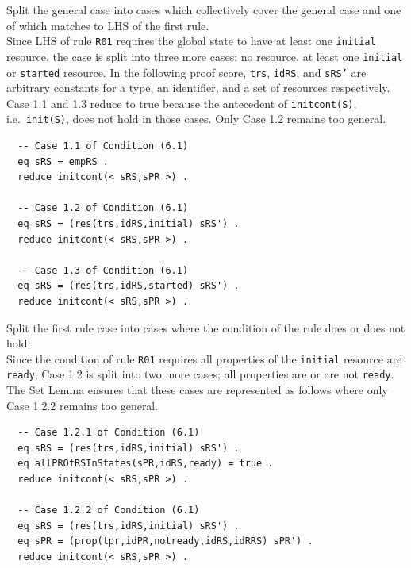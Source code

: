 \documentclass[12pt]{report}
\newcommand{\stt}[1]{{\small{\tt {#1}}}}
\begin{document}
 Split the general case into cases which
collectively cover the general case and one of which matches to LHS of
the first rule. \\ Since LHS of rule {\tt R01} requires the global
state to have at least one {\tt initial} resource, the case is split
into three more cases; no resource, at least one {\tt initial} or
{\tt started} resource. In the following proof score, {\tt trs},
{\tt idRS}, and {\tt sRS'} are arbitrary constants for a type, an
identifier, and a set of resources respectively.  Case 1.1 and 1.3
reduce to true because the antecedent of \stt{initcont(S)},
i.e.\ \stt{init(S)}, does not hold in those cases. Only Case 1.2
remains too general.
\begin{verbatim}
  -- Case 1.1 of Condition (6.1)
  eq sRS = empRS .
  reduce initcont(< sRS,sPR >) .

  -- Case 1.2 of Condition (6.1)
  eq sRS = (res(trs,idRS,initial) sRS') .
  reduce initcont(< sRS,sPR >) .

  -- Case 1.3 of Condition (6.1)
  eq sRS = (res(trs,idRS,started) sRS') .
  reduce initcont(< sRS,sPR >) .
\end{verbatim}

 Split the first rule case into cases where
the condition of the rule does or does not hold. \\ Since the
condition of rule {\tt R01} requires all properties of the
{\tt initial} resource are {\tt ready}, Case 1.2 is split into two
more cases; all properties are or are not {\tt ready}. The Set Lemma
ensures that these cases are represented as follows where only Case
1.2.2 remains too general.
\begin{verbatim}
  -- Case 1.2.1 of Condition (6.1)
  eq sRS = (res(trs,idRS,initial) sRS') .
  eq allPROfRSInStates(sPR,idRS,ready) = true .
  reduce initcont(< sRS,sPR >) .

  -- Case 1.2.2 of Condition (6.1)
  eq sRS = (res(trs,idRS,initial) sRS') .
  eq sPR = (prop(tpr,idPR,notready,idRS,idRRS) sPR') .
  reduce initcont(< sRS,sPR >) .
\end{verbatim}
\end{document}
